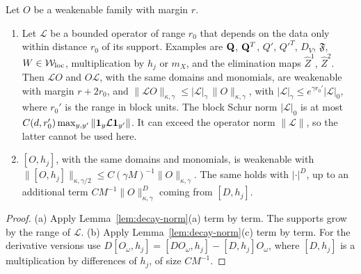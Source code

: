 \begin{lemma}\label{lem:weak-local-ops}
Let $O$ be a weakenable family with margin $r$.
\begin{enumerate}[label=(\alph*)]
\item Let $\mathcal L$ be a bounded operator of range $r_0$ that depends on the data only within distance $r_0$ of its support. Examples are $\mathbf Q$, $\mathbf Q^T$, $Q'$, $Q'^T$, $D_V$, $\mathfrak F$, $W\in\mathcal W_{\rm loc}$, multiplication by $h_j$ or $m_X$, and the elimination maps $\hat Z^1$, $\hat Z^2$. Then $\mathcal LO$ and $O\mathcal L$, with the same domains and monomials, are weakenable with margin $r+2r_0$, and $\|\mathcal LO\|_{\kappa,\gamma}\le|\mathcal L|_\gamma\,\|O\|_{\kappa,\gamma}$, with $|\mathcal L|_\gamma\le e^{\gamma r_0'}|\mathcal L|_0$, where $r_0'$ is the range in block units. The block Schur norm $|\mathcal L|_0$ is at most $C(d,r_0')\max_{y,y'}\|\mathbf 1_y\mathcal L\mathbf 1_{y'}\|$. It can exceed the operator norm $\|\mathcal L\|$, so the latter cannot be used here.
\item $[O,h_j]$, with the same domains and monomials, is weakenable with $\|[O,h_j]\|_{\kappa,\gamma/2}\le C(\gamma M)^{-1}\|O\|_{\kappa,\gamma}$. The same holds with $|\cdot|^D$, up to an additional term $CM^{-1}\|O\|^D_{\kappa,\gamma}$ coming from $[D,h_j]$.
\end{enumerate}
\end{lemma}

\begin{proof}
(a) Apply Lemma~\ref{lem:decay-norm}(a) term by term. The supports grow by the range of $\mathcal L$. (b) Apply Lemma~\ref{lem:decay-norm}(c) term by term. For the derivative versions use $D[O_\omega,h_j]=[DO_\omega,h_j]-[D,h_j]O_\omega$, where $[D,h_j]$ is a multiplication by differences of $h_j$, of size $CM^{-1}$.
\end{proof}
